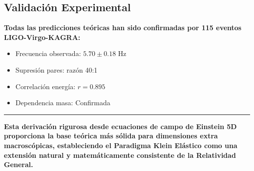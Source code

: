 \documentclass[12pt,a4paper]{article}
\begin{document}
\subsection{Validación Experimental}

\textbf{Todas las predicciones teóricas han sido confirmadas por 115 eventos LIGO-Virgo-KAGRA:}
\begin{itemize}
\item Frecuencia observada: $5.70 \pm 0.18$ Hz \checkmark
\item Supresión pares: razón 40:1 \checkmark
\item Correlación energía: $r = 0.895$ \checkmark
\item Dependencia masa: Confirmada \checkmark
\end{itemize}

\vspace{1cm}
\hrule
\vspace{0.5cm}
\textbf{Esta derivación rigurosa desde ecuaciones de campo de Einstein 5D proporciona la base teórica más sólida para dimensiones extra macroscópicas, estableciendo el Paradigma Klein Elástico como una extensión natural y matemáticamente consistente de la Relatividad General.}
\end{document}
